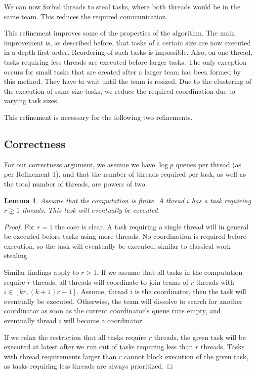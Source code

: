 \documentclass[preprint]{sigplanconf}
\newtheorem{lem}{Lemma}
\begin{document}
We can now forbid threads to steal tasks, where both threads would
be in the same team. This reduces the required communication.

This refinement improves some of the properties of the algorithm. The
main improvement is, as described before, that tasks of a certain size
are now executed in a depth-first order. Reordering of such tasks is
impossible. Also, on one thread, tasks requiring less threads are
executed before larger tasks. The only exception occurs for small
tasks that are created after a larger team has been formed by this
method. They have to wait until the team is resized. Due to the
clustering of the execution of same-size tasks, we reduce the required
coordination due to varying task sizes.

This refinement is necessary for the following two refinements.

\subsection{Correctness}

For our correctness argument, we assume we have $\log p$ queues per
thread (as per Refinement 1), and that the number of threads required
per task, as well as the total number of threads, are powers of two.

\begin{lem} 
Assume that the computation is finite. A thread $i$ has a task
requiring $r\geq 1$ threads. This task will eventually be executed.
\end{lem}

\begin{proof}
For $r=1$ the case is clear. A task requiring a single thread will in
general be executed before tasks using more threads. No coordination
is required before execution, so the task will eventually be executed,
similar to classical work-stealing.

Similar findings apply to $r>1$. If we assume that all tasks in the
computation require $r$ threads, all threads will coordinate to join
teams of $r$ threads with $i\in [kr,(k+1)r-1]$. Assume, thread $i$ is
the coordinator, then the task will eventually be executed. Otherwise,
the team will dissolve to search for another coordinator as soon as
the current coordinator's queue runs empty, and eventually thread $i$
will become a coordinator.

If we relax the restriction that all tasks require $r$ threads, the
given task will be executed at latest after we run out of tasks
requiring less than $r$ threads. Tasks with thread requirements larger
than $r$ cannot block execution of the given task, as tasks requiring
less threads are always prioritized.
\end{proof}
\end{document}
